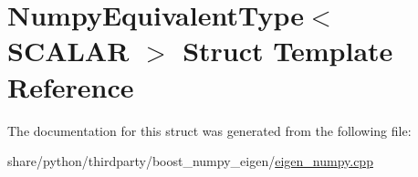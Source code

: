 \hypertarget{structNumpyEquivalentType}{}\section{Numpy\+Equivalent\+Type$<$ S\+C\+A\+L\+AR $>$ Struct Template Reference}
\label{structNumpyEquivalentType}


The documentation for this struct was generated from the following file\+:\begin{DoxyCompactItemize}
\item 
share/python/thirdparty/boost\+\_\+numpy\+\_\+eigen/\hyperlink{eigen__numpy_8cpp}{eigen\+\_\+numpy.\+cpp}\end{DoxyCompactItemize}
